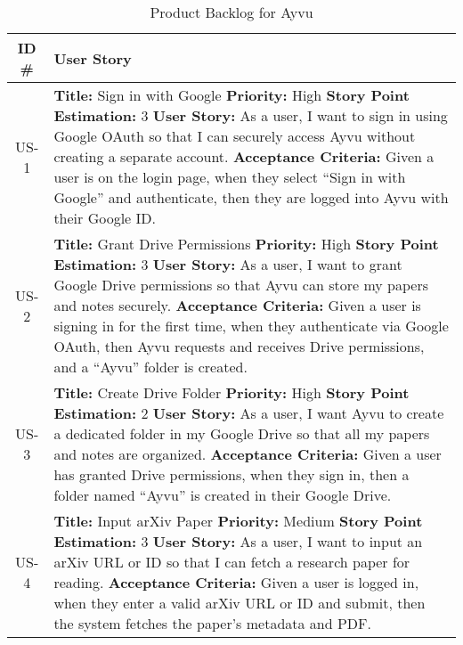 \documentclass[12pt]{article}
\begin{document}
\begin{longtable}{|c|p{15cm}|}
  \caption{Product Backlog for Ayvu}
  \label{tab:product-backlog} \\
  \hline
  \textbf{ID \#} & \textbf{User Story} \\
  \hline
  US-1 &
  \textbf{Title:} Sign in with Google \newline
  \textbf{Priority:} High \newline
  \textbf{Story Point Estimation:} 3 \newline
  \textbf{User Story:} As a user, I want to sign in using Google OAuth so that I can securely access Ayvu without creating a separate account. \newline
  \textbf{Acceptance Criteria:} Given a user is on the login page, when they select ``Sign in with Google'' and authenticate, then they are logged into Ayvu with their Google ID. \\
  \hline

  US-2 &
  \textbf{Title:} Grant Drive Permissions \newline
  \textbf{Priority:} High \newline
  \textbf{Story Point Estimation:} 3 \newline
  \textbf{User Story:} As a user, I want to grant Google Drive permissions so that Ayvu can store my papers and notes securely. \newline
  \textbf{Acceptance Criteria:} Given a user is signing in for the first time, when they authenticate via Google OAuth, then Ayvu requests and receives Drive permissions, and a ``Ayvu'' folder is created. \\

  \hline
  US-3 &
  \textbf{Title:} Create Drive Folder \newline
  \textbf{Priority:} High \newline
  \textbf{Story Point Estimation:} 2 \newline
  \textbf{User Story:} As a user, I want Ayvu to create a dedicated folder in my Google Drive so that all my papers and notes are organized. \newline
  \textbf{Acceptance Criteria:} Given a user has granted Drive permissions, when they sign in, then a folder named ``Ayvu'' is created in their Google Drive. \\

  \hline
  US-4 &
  \textbf{Title:} Input arXiv Paper \newline
  \textbf{Priority:} Medium \newline
  \textbf{Story Point Estimation:} 3 \newline
  \textbf{User Story:} As a user, I want to input an arXiv URL or ID so that I can fetch a research paper for reading. \newline
  \textbf{Acceptance Criteria:} Given a user is logged in, when they enter a valid arXiv URL or ID and submit, then the system fetches the paper's metadata and PDF. \\


\end{longtable}
\end{document}
